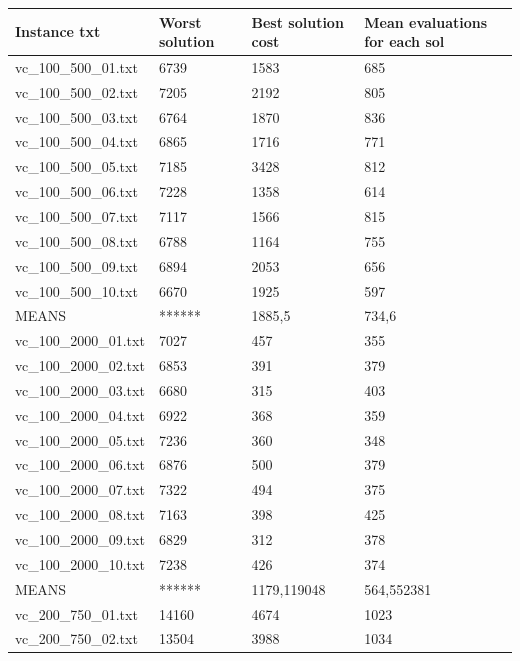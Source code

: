 \documentclass[11pt]{article}
\begin{document}
\begin{table}[!ht]
    \centering
    \begin{tabular}{|l|l|l|l|}
    \hline
        Instance txt & Worst solution & Best solution cost & Mean evaluations for each sol \\ \hline
        vc\_100\_500\_01.txt & 6739 & 1583 & 685 \\ \hline
        vc\_100\_500\_02.txt & 7205 & 2192 & 805 \\ \hline
        vc\_100\_500\_03.txt & 6764 & 1870 & 836 \\ \hline
        vc\_100\_500\_04.txt & 6865 & 1716 & 771 \\ \hline
        vc\_100\_500\_05.txt & 7185 & 3428 & 812 \\ \hline
        vc\_100\_500\_06.txt & 7228 & 1358 & 614 \\ \hline
        vc\_100\_500\_07.txt & 7117 & 1566 & 815 \\ \hline
        vc\_100\_500\_08.txt & 6788 & 1164 & 755 \\ \hline
        vc\_100\_500\_09.txt & 6894 & 2053 & 656 \\ \hline
        vc\_100\_500\_10.txt & 6670 & 1925 & 597 \\ \hline
        MEANS & ****** & 1885,5 & 734,6 \\ \hline
        vc\_100\_2000\_01.txt & 7027 & 457 & 355 \\ \hline
        vc\_100\_2000\_02.txt & 6853 & 391 & 379 \\ \hline
        vc\_100\_2000\_03.txt & 6680 & 315 & 403 \\ \hline
        vc\_100\_2000\_04.txt & 6922 & 368 & 359 \\ \hline
        vc\_100\_2000\_05.txt & 7236 & 360 & 348 \\ \hline
        vc\_100\_2000\_06.txt & 6876 & 500 & 379 \\ \hline
        vc\_100\_2000\_07.txt & 7322 & 494 & 375 \\ \hline
        vc\_100\_2000\_08.txt & 7163 & 398 & 425 \\ \hline
        vc\_100\_2000\_09.txt & 6829 & 312 & 378 \\ \hline
        vc\_100\_2000\_10.txt & 7238 & 426 & 374 \\ \hline
        MEANS & ****** & 1179,119048 & 564,552381 \\ \hline
        vc\_200\_750\_01.txt & 14160 & 4674 & 1023 \\ \hline
        vc\_200\_750\_02.txt & 13504 & 3988 & 1034 \\ \hline

\end{tabular}
\end{table}
\end{document}
